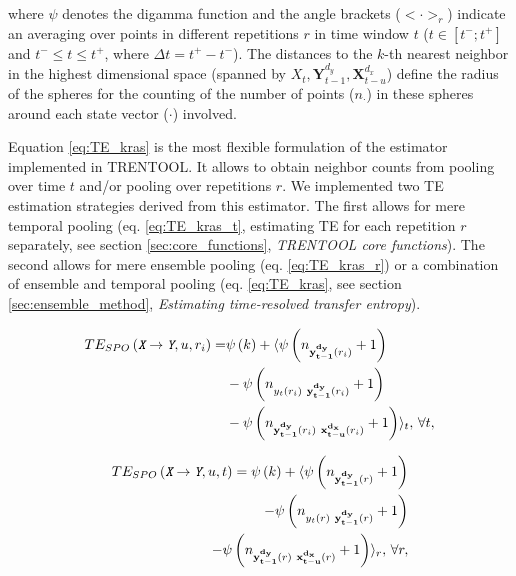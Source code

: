 \documentclass[a4paper,10pt]{article}
\begin{document}
\noindent where $\psi$ denotes the digamma function and the angle brackets ($<\cdot>_r$) indicate an averaging over points in different repetitions $r$ in time window $t$ ($t\in[t^-;t^+]$ and $t^-\leq t \leq t^+$, where $\Delta t=t^+-t^-$). The distances to the $k$-th nearest neighbor in the highest dimensional space (spanned by $X_t, \mathbf{Y}^{d_{y}}_{t-1}, \mathbf{X}^{d_{x}}_{t-u}$) define the radius of the spheres for the counting of the number of points ($n_{\cdot}$) in these spheres around each state vector ($\cdot$) involved. 

Equation \ref{eq:TE_kras} is the most flexible formulation of the estimator implemented in TRENTOOL. It allows to obtain neighbor counts from pooling over time $t$ and/or pooling over repetitions $r$. We implemented two TE estimation strategies derived from this estimator. The first allows for mere temporal pooling (eq. \ref{eq:TE_kras_t}, estimating TE for each repetition $r$ separately, see section \ref{sec:core_functions}, \textit{TRENTOOL core functions}). The second allows for mere ensemble pooling (eq. \ref{eq:TE_kras_r}) or a combination of ensemble and temporal pooling (eq. \ref{eq:TE_kras}, see section \ref{sec:ensemble_method}, \textit{Estimating time-resolved transfer entropy}). 

\begin{equation}
\label{eq:TE_kras_t}
\begin{split}
TE_{SPO}\left(\textit{\texttt{X}}\rightarrow \textit{\texttt{Y}},u,r_i\right) = &\psi\left(k\right) +\langle \psi  \left( n_{\mathbf{y_{t-1}^{d_{y}}}(r_i)} +1 \right)\\
    &-\psi \left( n_{y_t(r_i)\   \mathbf{y_{t-1}^{d_y}}(r_i)} +1 \right)\\
    &-\psi \left( n_{\mathbf{y_{t-1}^{d_y}}(r_i)\   \mathbf{x_{t-u}^{d_x}}(r_i)} +1 \right)    
  \rangle_{t}, \, \forall t,
\end{split}
\end{equation}

\begin{equation}
\label{eq:TE_kras_r}
\begin{split}
TE_{SPO}\left(\textit{\texttt{X}}\rightarrow \textit{\texttt{Y}},u,t\right) = \psi\left(k\right)
  +\langle 
    \psi  \left( n_{\mathbf{y_{t-1}^{d_{y}}}(r)} +1 \right)\\
    -\psi \left( n_{y_t(r)\   \mathbf{y_{t-1}^{d_y}}(r)} +1 \right)\\
    -\psi \left( n_{\mathbf{y_{t-1}^{d_y}}(r)\   \mathbf{x_{t-u}^{d_x}}(r)} +1 \right) 
  \rangle_{r}, \, \forall r,
\end{split}
\end{equation}
\end{document}
